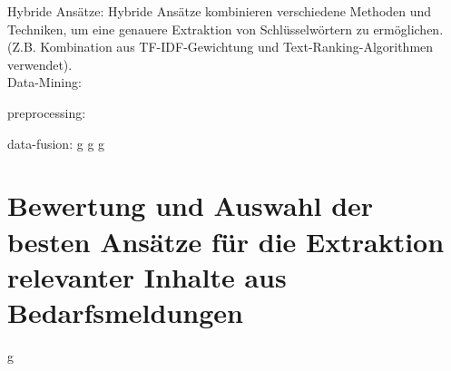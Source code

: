 Hybride Ansätze: Hybride Ansätze kombinieren verschiedene Methoden und Techniken, um eine genauere Extraktion von Schlüsselwörtern zu ermöglichen. (Z.B. Kombination aus TF-IDF-Gewichtung und Text-Ranking-Algorithmen verwendet).\cite{darmawan2015hybrid} \\

Data-Mining: \cite{jun2001review}\cite{jain2013data}

preprocessing: \cite{garcia2016big}

data-fusion: \cite{famili1997data} \cite{frank2005comparing} \cite{bohne2013data}
\newpage
g
\newpage
g
\newpage
g
\newpage

\section{Bewertung und Auswahl der besten Ansätze für die Extraktion relevanter Inhalte aus Bedarfsmeldungen}

\newpage
g
\newpage